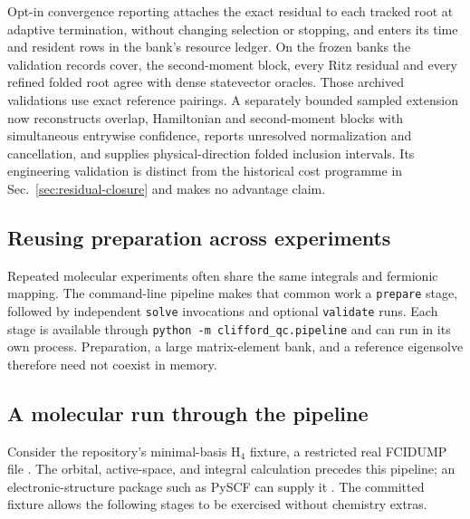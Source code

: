 \documentclass[aps,pra,reprint,superscriptaddress,nofootinbib,floatfix,
  showkeys]{revtex4-2}
\begin{document}
Opt-in convergence reporting attaches the exact residual to each tracked root at
adaptive termination, without changing selection or stopping, and enters its
time and resident rows in the bank's resource ledger. On the \cqcResidualBanks{}
frozen banks the validation records cover, the second-moment block, every Ritz
residual and every refined folded root agree with dense statevector oracles.
Those archived validations use exact reference pairings. A separately bounded
sampled extension now reconstructs overlap, Hamiltonian and second-moment
blocks with simultaneous entrywise confidence, reports unresolved normalization
and cancellation, and supplies physical-direction folded inclusion intervals.
Its engineering validation is distinct from the historical cost programme in
Sec.~\ref{sec:residual-closure} and makes no advantage claim.

\subsection{Reusing preparation across experiments}

Repeated molecular experiments often share the same integrals and fermionic
mapping. The command-line pipeline makes that common work a
\texttt{prepare} stage, followed by independent \texttt{solve} invocations
and optional \texttt{validate} runs. Each stage is available through
\texttt{python -m clifford\_qc.pipeline} and can run in its own process.
Preparation, a large matrix-element bank, and a reference eigensolve
therefore need not coexist in memory.

\subsection{A molecular run through the pipeline}
\label{sec:molecular}

Consider the repository's minimal-basis H$_4$ fixture, a restricted real
FCIDUMP file \cite{knowles1989fcidump}. The orbital, active-space, and
integral calculation precedes this pipeline; an electronic-structure
package such as PySCF can supply it \cite{sun2018pyscf}. The committed
fixture allows the following stages to be exercised without chemistry
extras.
\end{document}
